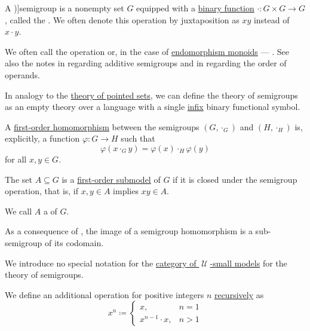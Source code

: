 \begin{definition}\label{def:semigroup}
  A \term[ru=полугруппа (\cite[28]{Ляпин1960})]{semigroup} is a nonempty set \( G \) equipped with a \hyperref[rem:function_arguments]{binary function} \( \cdot: G \times G \to G \), called the . We often denote this operation by juxtaposition as \( xy \) instead of \( x \cdot y \).

  We often call the operation  or, in the case of \hyperref[def:endomorphism_monoid]{endomorphism monoids} --- . See also the notes in  regarding additive semigroups and in  regarding the order of operands.

  \begin{thmenum}[series=def:semigroup]
     In analogy to the \hyperref[def:pointed_set/theory]{theory of pointed sets}, we can define the theory of semigroups as an empty theory over a language with a single \hyperref[rem:first_order_formula_conventions/infix]{infix} binary functional symbol.

     A \hyperref[def:first_order_homomorphism]{first-order homomorphism} between the semigroups \( (G, \cdot_{G}) \) and \( (H, \cdot_{H}) \) is, explicitly, a function \( \varphi: G \to H \) such that
    \begin{equation}\label{eq:def:semigroup/homomorphism}
      \varphi(x \cdot_{G} y) = \varphi(x) \cdot_{H} \varphi(y)
    \end{equation}
    for all \( x, y \in G \).

     The set \( A \subseteq G \) is a \hyperref[def:first_order_substructure]{first-order submodel} of \( G \) if it is closed under the semigroup operation, that is, if \( x, y \in A \) implies \( xy \in A \).

    We call \( A \) a  of \( G \).

    As a consequence of , the image of a semigroup homomorphism is a sub-semigroup of its codomain.

     We introduce no special notation for the \hyperref[def:category_of_small_first_order_models]{category of \( \mscrU \)-small models} for the theory of semigroups.

     We define an additional  operation for positive integers \( n \) \hyperref[rem:natural_number_recursion]{recursively} as
    \begin{equation}\label{eq:def:semigroup/exponentiation}
      x^n \coloneqq \begin{cases}
        x,               &n = 1 \\
        x^{n-1} \cdot x, &n > 1
      \end{cases}
    \end{equation}


\end{thmenum}
\end{definition}
